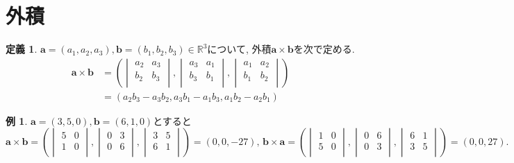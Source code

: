 \documentclass[dvipdfmx,a4paper,11pt]{article}
\newcommand{\R}{\mathbb{R}}
\theoremstyle{definition}
\newtheorem{dfn}[thm]{定義}
\newtheorem{exa}[thm]{例}
\begin{document}
\section{外積}
\begin{tcolorbox}[
    colback = white,
    colframe = green!35!black,
    fonttitle = \bfseries,
    breakable = true]
    \begin{dfn}
$\bm{a}=(a_1, a_2, a_3), \bm{b}=(b_1, b_2, b_3)\in \R^3$について, 外積$\bm{a} \times \bm{b}$を次で定める. 
\begin{align*}
\bm{a} \times \bm{b} 
&=\left(\begin{vmatrix}
a_2&a_3\\
b_2&b_3 \\
\end{vmatrix},
\begin{vmatrix}
a_3&a_1\\
b_3&b_1 \\
\end{vmatrix},
\begin{vmatrix}
a_1&a_2\\
b_1&b_2 \\
\end{vmatrix}
\right)
\\
&=
( a_2b_3 - a_3b_2, a_3b_1-a_1b_3, a_1b_2-a_2b_1)  
\end{align*}
\end{dfn}
 \end{tcolorbox}
 \begin{exa}
 $\bm{a}=(3, 5, 0), \bm{b}=(6, 1, 0)$とすると
 $$
 \bm{a} \times \bm{b}
 =\left(\begin{vmatrix}
5&0\\
1&0 \\
\end{vmatrix},
\begin{vmatrix}
0&3\\
0&6 \\
\end{vmatrix},
\begin{vmatrix}
3&5\\
6&1 \\
\end{vmatrix}
\right)
= (0,0,-27)
\text{, } 
\bm{b} \times  \bm{a} 
 =\left(\begin{vmatrix}
1&0 \\
5&0\\
\end{vmatrix},
\begin{vmatrix}
0&6 \\
0&3\\
\end{vmatrix},
\begin{vmatrix}
6&1 \\
3&5\\
\end{vmatrix}
\right)
= (0,0,27).
 $$
 \end{exa}
 
\end{document}
